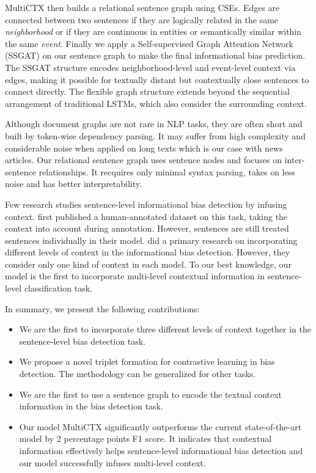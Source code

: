\documentclass[letterpaper]{article} %
\begin{document}
MultiCTX then builds a relational sentence graph using CSEs. Edges are connected between two sentences if they are logically related in the same \textit{neighborhood} or if they are continuous in entities or semantically similar within the same \textit{event}. Finally we apply a Self-supervised Graph Attention Network (SSGAT) on our sentence graph to make the final informational bias prediction. The SSGAT structure encodes neighborhood-level and event-level context via edges, making it possible for textually distant but contextually close sentences to connect directly. The flexible graph structure extends beyond the sequential arrangement of traditional LSTMs, which also consider the surrounding context. 

Although document graphs are not rare in NLP tasks, they are often short and built by token-wise dependency parsing. It may suffer from high complexity and considerable noise when applied on long texts which is our case with news articles. Our relational sentence graph uses sentence nodes and focuses on inter-sentence relationships. It recquires only minimal syntax parsing, takes on less noise and has better interpretability.


Few research studies sentence-level informational bias detection by infusing context. \citet{fan-etal-2019-plain} first published a human-annotated dataset on this task, taking the context into account during annotation. However, sentences are still treated sentences individually in their model. \citet{van-den-berg-markert-2020-context} did a primary research on incorporating different levels of context in the informational bias detection. However, they consider only one kind of context in each model. To our best knowledge, our model is the first to incorporate multi-level contextual information in sentence-level classification task.

In summary, we present the following contributions:

\begin{itemize}
  \item We are the first to incorporate three different levels of context together in the sentence-level bias detection task. 
  \item We propose a novel triplet formation for contrastive learning in bias detection. The methodology can be generalized for other tasks.
  \item We are the first to use a sentence graph to encode the textual context information in the bias detection task.
  \item Our model MultiCTX significantly outperforms the current state-of-the-art model by 2 percentage points F1 score. It indicates that contextual information effectively helps sentence-level informational bias detection and our model successfully infuses multi-level context.
\end{itemize}
\end{document}
